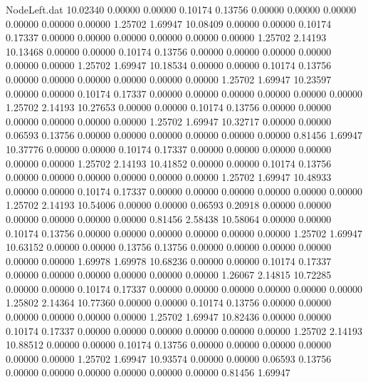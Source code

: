 \begin{filecontents}{NodeLeft.dat}
  10.02340    0.00000    0.00000     0.10174    0.13756    0.00000    0.00000    0.00000    0.00000    0.00000    0.00000    1.25702    1.69947
  10.08409    0.00000    0.00000     0.10174    0.17337    0.00000    0.00000    0.00000    0.00000    0.00000    0.00000    1.25702    2.14193
  10.13468    0.00000    0.00000     0.10174    0.13756    0.00000    0.00000    0.00000    0.00000    0.00000    0.00000    1.25702    1.69947
  10.18534    0.00000    0.00000     0.10174    0.13756    0.00000    0.00000    0.00000    0.00000    0.00000    0.00000    1.25702    1.69947
  10.23597    0.00000    0.00000     0.10174    0.17337    0.00000    0.00000    0.00000    0.00000    0.00000    0.00000    1.25702    2.14193
  10.27653    0.00000    0.00000     0.10174    0.13756    0.00000    0.00000    0.00000    0.00000    0.00000    0.00000    1.25702    1.69947
  10.32717    0.00000    0.00000     0.06593    0.13756    0.00000    0.00000    0.00000    0.00000    0.00000    0.00000    0.81456    1.69947
  10.37776    0.00000    0.00000     0.10174    0.17337    0.00000    0.00000    0.00000    0.00000    0.00000    0.00000    1.25702    2.14193
  10.41852    0.00000    0.00000     0.10174    0.13756    0.00000    0.00000    0.00000    0.00000    0.00000    0.00000    1.25702    1.69947
  10.48933    0.00000    0.00000     0.10174    0.17337    0.00000    0.00000    0.00000    0.00000    0.00000    0.00000    1.25702    2.14193
  10.54006    0.00000    0.00000     0.06593    0.20918    0.00000    0.00000    0.00000    0.00000    0.00000    0.00000    0.81456    2.58438
  10.58064    0.00000    0.00000     0.10174    0.13756    0.00000    0.00000    0.00000    0.00000    0.00000    0.00000    1.25702    1.69947
  10.63152    0.00000    0.00000     0.13756    0.13756    0.00000    0.00000    0.00000    0.00000    0.00000    0.00000    1.69978    1.69978
  10.68236    0.00000    0.00000     0.10174    0.17337    0.00000    0.00000    0.00000    0.00000    0.00000    0.00000    1.26067    2.14815
  10.72285    0.00000    0.00000     0.10174    0.17337    0.00000    0.00000    0.00000    0.00000    0.00000    0.00000    1.25802    2.14364
  10.77360    0.00000    0.00000     0.10174    0.13756    0.00000    0.00000    0.00000    0.00000    0.00000    0.00000    1.25702    1.69947
  10.82436    0.00000    0.00000     0.10174    0.17337    0.00000    0.00000    0.00000    0.00000    0.00000    0.00000    1.25702    2.14193
  10.88512    0.00000    0.00000     0.10174    0.13756    0.00000    0.00000    0.00000    0.00000    0.00000    0.00000    1.25702    1.69947
  10.93574    0.00000    0.00000     0.06593    0.13756    0.00000    0.00000    0.00000    0.00000    0.00000    0.00000    0.81456    1.69947

\end{filecontents}

